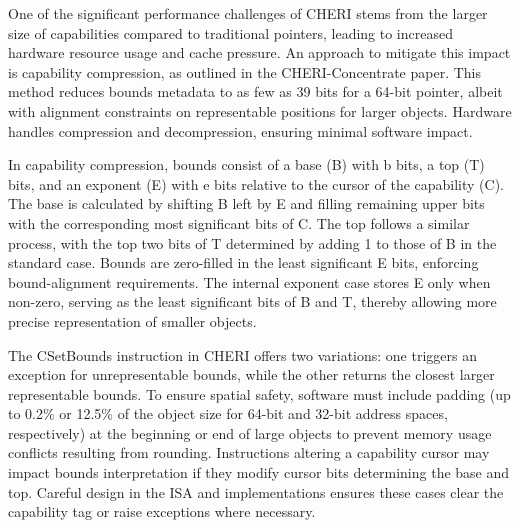 One of the significant performance challenges of CHERI stems from the larger size of capabilities compared to traditional pointers, leading to 
increased hardware resource usage and cache pressure. 
An approach to mitigate this impact is capability compression, as outlined in the CHERI-Concentrate paper\cite{woodruff_cheri_2019}. This method reduces bounds metadata 
to as few as 39 bits for a 64-bit pointer, albeit with alignment constraints on representable positions for larger objects. Hardware handles 
compression and decompression, ensuring minimal software impact.
\newline

In capability compression, bounds consist of a base (B) with b bits, a top (T) bits, and 
an exponent (E) with e bits relative to the cursor of the capability (C). The base is calculated by shifting B 
left by E and filling remaining upper bits with the corresponding most significant bits of C. The top follows a 
similar process, with the top two bits of T determined by adding 1 to those of B in the standard case. Bounds 
are zero-filled in the least significant E bits, enforcing bound-alignment requirements. The internal exponent case stores E only 
when non-zero, serving as the least significant bits of B and T, thereby allowing more precise representation of smaller objects.
\newline

The CSetBounds instruction in CHERI offers two variations: one triggers an exception for unrepresentable bounds, while the other returns 
the closest larger representable bounds. To ensure spatial safety, software must include padding (up to 0.2\% or 12.5\% of the object size 
for 64-bit and 32-bit address spaces, respectively) at the beginning or end of large objects to prevent memory usage conflicts resulting 
from rounding. Instructions altering a capability cursor may impact bounds interpretation if they modify cursor bits determining the 
base and top. Careful design in the ISA and implementations ensures these cases clear the capability tag or raise exceptions where necessary.














